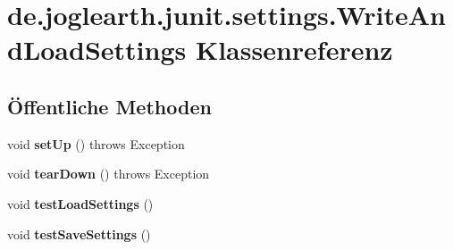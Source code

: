 \section{de.\-joglearth.\-junit.\-settings.\-Write\-And\-Load\-Settings \-Klassenreferenz}
\label{classde_1_1joglearth_1_1junit_1_1settings_1_1_write_and_load_settings}
\subsection*{Öffentliche \-Methoden}
\begin{DoxyCompactItemize}
\item 
void {\bfseries set\-Up} ()  throws Exception \label{classde_1_1joglearth_1_1junit_1_1settings_1_1_write_and_load_settings_a06e4efab84fcb9b0e8a253511a2643ce}

\item 
void {\bfseries tear\-Down} ()  throws Exception \label{classde_1_1joglearth_1_1junit_1_1settings_1_1_write_and_load_settings_afcf47dbb059815e87e0692590fc692fe}

\item 
void {\bfseries test\-Load\-Settings} ()\label{classde_1_1joglearth_1_1junit_1_1settings_1_1_write_and_load_settings_a11152fb7f2ccd35c23564ac98449fae0}

\item 
void {\bfseries test\-Save\-Settings} ()\label{classde_1_1joglearth_1_1junit_1_1settings_1_1_write_and_load_settings_aac9077c0328a8f344265a86e1fffd761}

\end{DoxyCompactItemize}
